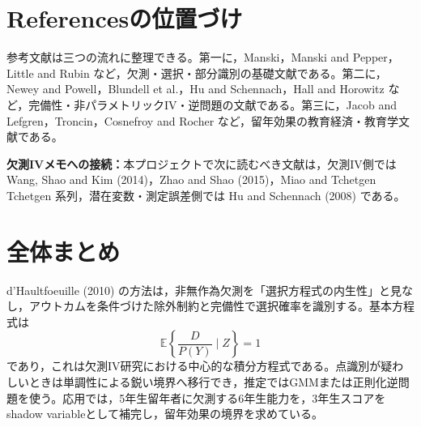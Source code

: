 \documentclass[10pt,a4paper]{article}
\newcommand{\E}{\mathbb{E}}
\newcommand{\connect}[1]{\par\smallskip\noindent\textbf{欠測IVメモへの接続：}#1\par\smallskip}
\begin{document}
\section{Referencesの位置づけ}

参考文献は三つの流れに整理できる。第一に，Manski，Manski and Pepper，Little and Rubin など，欠測・選択・部分識別の基礎文献である。第二に，Newey and Powell，Blundell et al.，Hu and Schennach，Hall and Horowitz など，完備性・非パラメトリックIV・逆問題の文献である。第三に，Jacob and Lefgren，Troncin，Cosnefroy and Rocher など，留年効果の教育経済・教育学文献である。

\connect{本プロジェクトで次に読むべき文献は，欠測IV側では Wang, Shao and Kim (2014)，Zhao and Shao (2015)，Miao and Tchetgen Tchetgen 系列，潜在変数・測定誤差側では Hu and Schennach (2008) である。}

\section*{全体まとめ}

d'Haultfoeuille (2010) の方法は，非無作為欠測を「選択方程式の内生性」と見なし，アウトカムを条件づけた除外制約と完備性で選択確率を識別する。基本方程式は
\[
\E\left\{\frac{D}{P(Y)}\mid Z\right\}=1
\]
であり，これは欠測IV研究における中心的な積分方程式である。点識別が疑わしいときは単調性による鋭い境界へ移行でき，推定ではGMMまたは正則化逆問題を使う。応用では，5年生留年者に欠測する6年生能力を，3年生スコアをshadow variableとして補完し，留年効果の境界を求めている。
\end{document}
